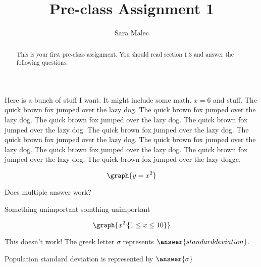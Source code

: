 \documentclass[handout, space]{ximera}
\title{Pre-class Assignment 1}
\author{Sara Malec}
\begin{document}
\begin{abstract}
  This is your first pre-class assignment. You should read section 1.3 and answer the following questions.
\end{abstract}
\maketitle

\begin{leash}{50}
Here is a bunch of stuff I want. It might include some math. $x=6$ and stuff.
The quick brown fox jumped over the lazy dog.
The quick brown fox jumped over the lazy dog.
The quick brown fox jumped over the lazy dog.
The quick brown fox jumped over the lazy dog.
The quick brown fox jumped over the lazy dog.
The quick brown fox jumped over the lazy dog.
The quick brown fox jumped over the lazy dog.
The quick brown fox jumped over the lazy dog.
The quick brown fox jumped over the lazy dog.
The quick brown fox jumped over the lazy doggc.
\end{leash}


\begin{problem}

\[\graph{y=x^2}\]

\end{problem}

\begin{problem} Does multiple answer work?
\begin{selectAll}
\end{selectAll}
\end{problem}

\begin{problem}
\begin{foldable}
 Something unimportant  somthing
unimportant 
\end{foldable}
   \[ 
   \graph{x^2 \left\{ 1 \leq x \leq 10 \right\} }
   \]
\end{problem}

\begin{problem}


    This doesn't work!  The greek letter $\sigma$ represents $\answer{standard deviation}$.
\end{problem}

\begin{problem}
    Population standard deviation is represented by $\answer{\sigma}$
\end{problem}
\end{document}
